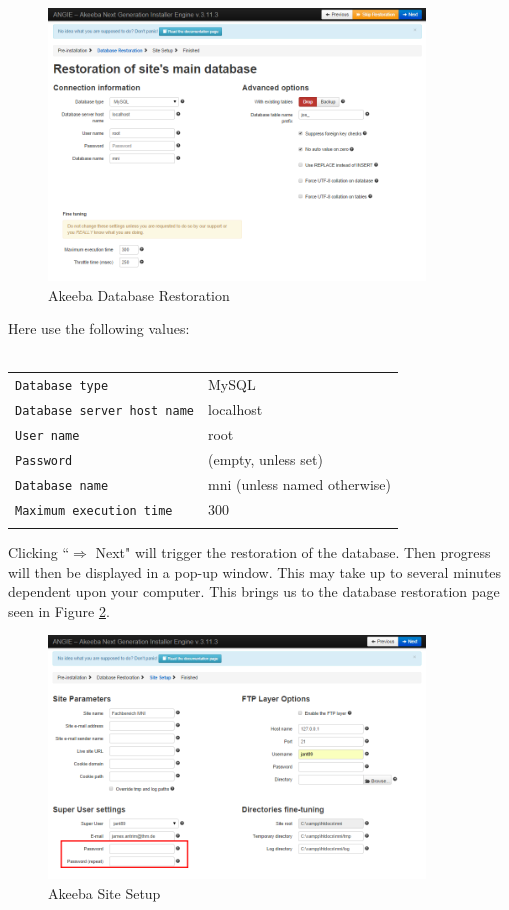 \documentclass[]{report}
\begin{document}
\newpage

\begin{figure}[h] 
	\centering
	\includegraphics[width=10cm]{akeeba2.png}
	\caption{Akeeba Database Restoration}
	\label{fig:akeebadatabaserestoration}
\end{figure}

\noindent
Here use the following values:\\
\\
\begin{tabular}{l l}
	\texttt{Database type} & MySQL\\
	\texttt{Database server host name} & localhost\\
	\texttt{User name} & root\\
	\texttt{Password} & (empty, unless set)\\
	\texttt{Database name} & mni (unless named otherwise)\\
	\texttt{Maximum execution time} & 300\\\\
\end{tabular}

\noindent
Clicking ``$\Rightarrow$ Next" will trigger the restoration of the database. Then progress will then be displayed in a pop-up window. This may take up to several minutes dependent upon your computer. This brings us to the database restoration page seen in Figure \ref{fig:akeebasitesetup}.

\newpage

\begin{figure}[h] 
	\centering
	\includegraphics[width=10cm]{akeeba3.png}
	\caption{Akeeba Site Setup}
	\label{fig:akeebasitesetup}
\end{figure}
\end{document}
